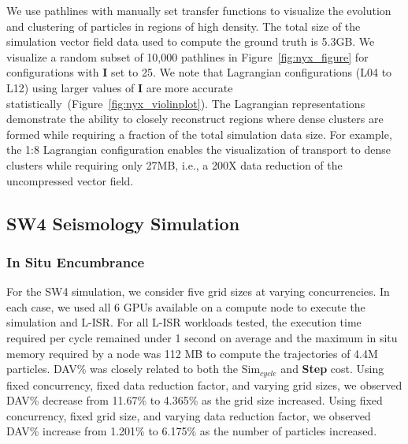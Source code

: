 We use pathlines with manually set transfer functions to visualize the evolution and clustering of particles in regions of high density.
%
The total size of the simulation vector field data used to compute the ground truth is 5.3GB.
%
We visualize a random subset of 10,000 pathlines in Figure~\ref{fig:nyx_figure} for configurations with \textbf{I} set to 25.
%
We note that Lagrangian configurations (L04 to L12) using larger values of \textbf{I} are more accurate statistically~(Figure~\ref{fig:nyx_violinplot}).
%
%
The Lagrangian representations demonstrate the ability to closely reconstruct regions where dense clusters are formed while requiring a fraction of the total simulation data size.
%
For example, the 1:8 Lagrangian configuration enables the visualization of transport to dense clusters while requiring only 27MB, i.e., a 200X data reduction of the uncompressed vector field.
%

\subsection{SW4 Seismology Simulation}
\subsubsection{In Situ Encumbrance}

For the SW4 simulation, we consider five grid sizes at varying concurrencies.
%
In each case, we used all 6 GPUs available on a compute node to execute the simulation and L-ISR.
%
For all L-ISR workloads tested, the execution time required per cycle remained under 1 second on average and the maximum in situ memory required by a node was 112 MB to compute the trajectories of 4.4M particles.
%
DAV\% was closely related to both the Sim$_{cycle}$ and \textbf{Step} cost.
%
Using fixed concurrency, fixed data reduction factor, and varying grid sizes, we observed DAV\% decrease from 11.67\% to 4.365\% as the grid size increased.
%
Using fixed concurrency, fixed grid size, and varying data reduction factor, we observed DAV\% increase from 1.201\% to 6.175\% as the number of particles increased.
%





